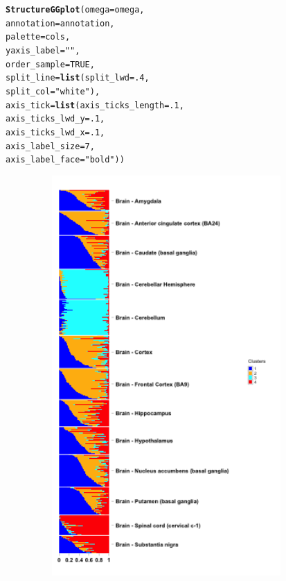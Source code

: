 \documentclass[12pt]{article}\usepackage[]{graphicx}\usepackage[usenames,dvipsnames]{color}
\makeatletter
\newcommand{\hlnum}[1]{\textcolor[rgb]{0.686,0.059,0.569}{#1}}%
\newcommand{\hlstr}[1]{\textcolor[rgb]{0.192,0.494,0.8}{#1}}%
\newcommand{\hlstd}[1]{\textcolor[rgb]{0.345,0.345,0.345}{#1}}%
\newcommand{\hlkwc}[1]{\textcolor[rgb]{0.333,0.667,0.333}{#1}}%
\newcommand{\hlkwd}[1]{\textcolor[rgb]{0.737,0.353,0.396}{\textbf{#1}}}%
\newenvironment{kframe}{%
 \def\at@end@of@kframe{}%
 \ifinner\ifhmode%
  \def\at@end@of@kframe{\end{minipage}}%
  \begin{minipage}{\columnwidth}%
 \fi\fi%
 \def\FrameCommand##1{\hskip\@totalleftmargin \hskip-\fboxsep
 \colorbox{shadecolor}{##1}\hskip-\fboxsep
     \hskip-\linewidth \hskip-\@totalleftmargin \hskip\columnwidth}%
 \MakeFramed {\advance\hsize-\width
   \@totalleftmargin\z@ \linewidth\hsize
   \@setminipage}}%
 {\par\unskip\endMakeFramed%
 \at@end@of@kframe}
\newenvironment{knitrout}{}{} %
\makeatother
\begin{document}
\begin{knitrout}
\color{fgcolor}\begin{kframe}
\begin{alltt}
\hlkwd{StructureGGplot}\hlstd{(}\hlkwc{omega} \hlstd{= omega,}
                \hlkwc{annotation}\hlstd{= annotation,}
                \hlkwc{palette} \hlstd{= cols,}
                \hlkwc{yaxis_label} \hlstd{=} \hlstr{""}\hlstd{,}
                \hlkwc{order_sample} \hlstd{=} \hlnum{TRUE}\hlstd{,}
                \hlkwc{split_line} \hlstd{=} \hlkwd{list}\hlstd{(}\hlkwc{split_lwd} \hlstd{=} \hlnum{.4}\hlstd{,}
                                  \hlkwc{split_col} \hlstd{=} \hlstr{"white"}\hlstd{),}
                \hlkwc{axis_tick} \hlstd{=} \hlkwd{list}\hlstd{(}\hlkwc{axis_ticks_length} \hlstd{=} \hlnum{.1}\hlstd{,}
                                 \hlkwc{axis_ticks_lwd_y} \hlstd{=} \hlnum{.1}\hlstd{,}
                                 \hlkwc{axis_ticks_lwd_x} \hlstd{=} \hlnum{.1}\hlstd{,}
                                 \hlkwc{axis_label_size} \hlstd{=} \hlnum{7}\hlstd{,}
                                 \hlkwc{axis_label_face} \hlstd{=} \hlstr{"bold"}\hlstd{))}
\end{alltt}
\end{kframe}
\end{knitrout}


\begin{figure}[htp]
\begin{center}
\includegraphics[width=4in,height=6in]{figure/gtex_annot-1}
\end{center}
\end{figure}
\end{document}
